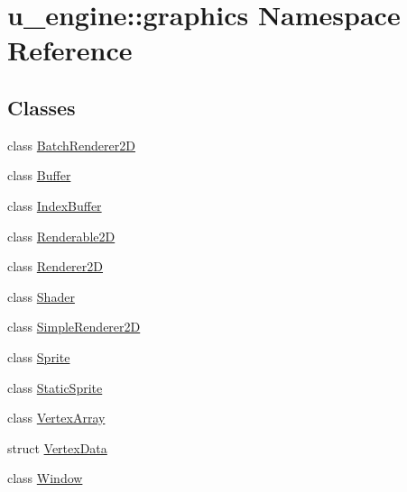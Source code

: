 \hypertarget{namespaceu__engine_1_1graphics}{}\section{u\+\_\+engine\+:\+:graphics Namespace Reference}
\label{namespaceu__engine_1_1graphics}
\subsection*{Classes}
\begin{DoxyCompactItemize}
\item 
class \hyperlink{classu__engine_1_1graphics_1_1_batch_renderer2_d}{Batch\+Renderer2\+D}
\item 
class \hyperlink{classu__engine_1_1graphics_1_1_buffer}{Buffer}
\item 
class \hyperlink{classu__engine_1_1graphics_1_1_index_buffer}{Index\+Buffer}
\item 
class \hyperlink{classu__engine_1_1graphics_1_1_renderable2_d}{Renderable2\+D}
\item 
class \hyperlink{classu__engine_1_1graphics_1_1_renderer2_d}{Renderer2\+D}
\item 
class \hyperlink{classu__engine_1_1graphics_1_1_shader}{Shader}
\item 
class \hyperlink{classu__engine_1_1graphics_1_1_simple_renderer2_d}{Simple\+Renderer2\+D}
\item 
class \hyperlink{classu__engine_1_1graphics_1_1_sprite}{Sprite}
\item 
class \hyperlink{classu__engine_1_1graphics_1_1_static_sprite}{Static\+Sprite}
\item 
class \hyperlink{classu__engine_1_1graphics_1_1_vertex_array}{Vertex\+Array}
\item 
struct \hyperlink{structu__engine_1_1graphics_1_1_vertex_data}{Vertex\+Data}
\item 
class \hyperlink{classu__engine_1_1graphics_1_1_window}{Window}
\end{DoxyCompactItemize}
